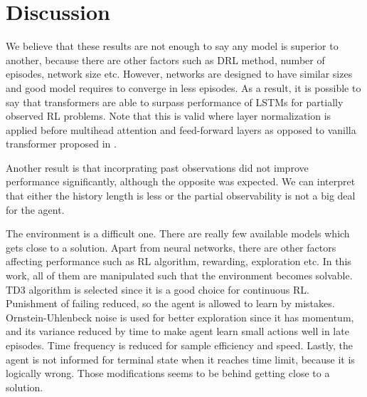 \section{Discussion}
We believe that these results are not enough to say any model is superior to another, because there are other factors such as DRL method, number of episodes, network size etc. 
However, networks are designed to have similar sizes and good model requires to converge in less episodes. 
As a result, it is possible to say that transformers are able to surpass performance of LSTMs for partially observed RL problems. 
Note that this is valid where layer normalization is applied before multihead attention and feed-forward layers \cite{xiong_layer_2020} as opposed to vanilla transformer proposed in \cite{vaswani_attention_2017}. 

Another result is that incorprating past observations did not improve performance significantly, although the opposite was expected. 
We can interpret that either the history length is less or the partial observability is not a big deal for the agent. 

The environment is a difficult one. 
There are really few available models which gets close to a solution. 
Apart from neural networks, there are other factors affecting performance such as RL algorithm, rewarding, exploration etc. 
In this work, all of them are manipulated such that the environment becomes solvable. 
TD3 algorithm is selected since it is a good choice for continuous RL. 
Punishment of failing reduced, so the agent is allowed to learn by mistakes. 
Ornstein-Uhlenbeck noise is used for better exploration since it has momentum, and its variance reduced by time to make agent learn small actions well in late episodes. 
Time frequency is reduced for sample efficiency and speed. 
Lastly, the agent is not informed for terminal state when it reaches time limit, because it is logically wrong. Those modifications seems to be behind getting close to a solution. 
